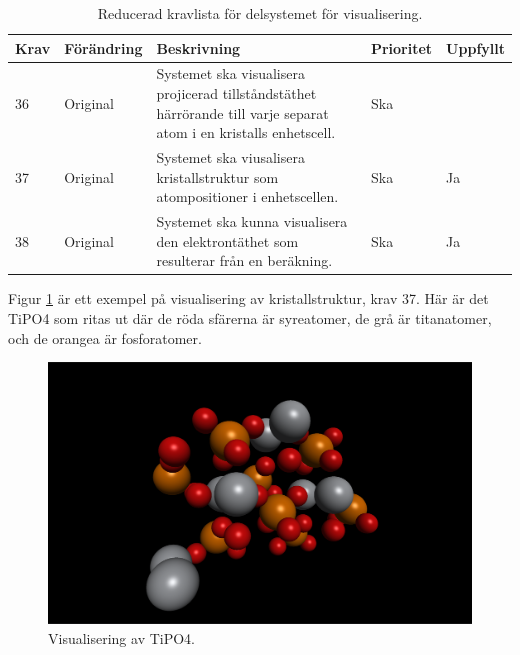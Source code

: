 \documentclass[a4paper,12pt]{article}
\begin{document}
\begin{table}[H]
\caption{Reducerad kravlista för delsystemet för visualisering.}
\begin{center}
\begin{tabular}{ |p{10mm}|p{20mm}|p{70mm}|p{15mm}|p{15mm}|}
\hline
 \textbf{Krav} & \textbf{Förändring} & \textbf{Beskrivning} & \textbf{Prioritet} & \textbf{Uppfyllt}  \\ 
\hline
36 & Original & Systemet ska visualisera projicerad tillståndstäthet härrörande till varje separat atom i en kristalls enhetscell. & Ska &  \\
\hline
37 & Original & Systemet ska viusalisera kristallstruktur som atompositioner i enhetscellen. & Ska & Ja \\
\hline
38 & Original & Systemet ska kunna visualisera den elektrontäthet som resulterar från en beräkning. & Ska & Ja \\
\hline
\end{tabular}
\label{table:kravlista visualisering}
\end{center}
\end{table}

Figur \ref{fig:visualisering_TiPO4} är ett exempel på visualisering av kristallstruktur, krav 37. Här är det TiPO4 som ritas ut där de röda sfärerna är syreatomer, de grå är titanatomer, och de orangea är fosforatomer.
\begin{figure}[H]
	\centering
	\includegraphics[scale=0.15]{TiPO4_visualisering.png}
	\caption{Visualisering av TiPO4.}
	\label{fig:visualisering_TiPO4}
\end{figure}
\end{document}
